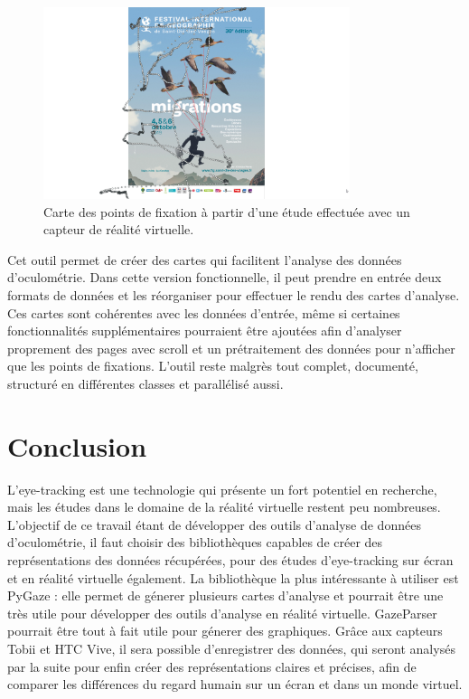 \documentclass[hidelinks,12pt]{article}
\begin{document}
\begin{figure}[htpb]
  \centering
  \includegraphics[width=0.8\textwidth,keepaspectratio=true]{vr-raw-0.png}
  \caption{Carte des points de fixation à partir d'une étude effectuée avec un
    capteur de réalité virtuelle.}
  \label{fig:vr-resultats-raw}
\end{figure}

\bigskip
Cet outil permet de créer des cartes qui facilitent l'analyse des données
d'oculométrie. Dans cette version fonctionnelle, il peut prendre en entrée deux
formats de données et les réorganiser pour effectuer le rendu des cartes
d'analyse. Ces cartes sont cohérentes avec les données d'entrée, même si
certaines fonctionnalités supplémentaires pourraient être ajoutées afin
d'analyser proprement des pages avec scroll et un prétraitement des données
pour n'afficher que les points de fixations. L'outil reste malgrès tout complet,
documenté, structuré en différentes classes et parallélisé aussi.



\section{Conclusion}

L'eye-tracking est une technologie qui présente un fort potentiel en recherche,
mais les études dans le domaine de la réalité virtuelle restent peu nombreuses.
L'objectif de ce travail étant de développer des outils d'analyse de données
d'oculométrie, il faut choisir des bibliothèques capables de créer des
représentations des données récupérées, pour des études d'eye-tracking sur écran
et en réalité virtuelle également. La bibliothèque la plus intéressante à
utiliser est PyGaze : elle permet de génerer plusieurs cartes d'analyse et
pourrait être une très utile pour développer des outils d'analyse en réalité
virtuelle. GazeParser pourrait être tout à fait utile pour génerer des
graphiques. Grâce aux capteurs Tobii et HTC Vive, il sera possible
d'enregistrer des données, qui seront analysés par la suite pour enfin créer
des représentations claires et précises, afin de comparer les différences du
regard humain sur un écran et dans un monde virtuel.




\end{document}
